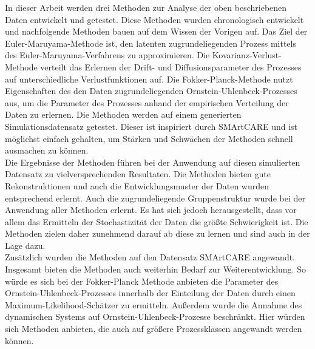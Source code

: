 \documentclass[11pt,titlepage]{article}
\theoremstyle{definition}
\theoremstyle{remark}
\begin{document}
	In dieser Arbeit werden drei Methoden zur Analyse der oben beschriebenen Daten entwickelt und getestet. Diese Methoden wurden chronologisch entwickelt und nachfolgende Methoden bauen auf dem Wissen der Vorigen auf. Das Ziel der Euler-Maruyama-Methode ist, den latenten zugrundeliegenden Prozess mittels des Euler-Maruyama-Verfahrens zu approximieren. Die Kovarianz-Verlust-Methode verteilt das Erlernen der Drift- und Diffusionsparameter des Prozesses auf unterschiedliche Verlustfunktionen auf. Die Fokker-Planck-Methode nutzt Eigenschaften des den Daten zugrundeliegenden Ornstein-Uhlenbeck-Prozesses aus, um die Parameter des Prozesses anhand der empirischen Verteilung der Daten zu erlernen. Die Methoden werden auf einem generierten Simulationsdatensatz getestet. Dieser ist inspiriert durch  SMArtCARE und ist möglichst einfach gehalten, um Stärken und Schwächen der Methoden schnell ausmachen zu können.\\
	Die Ergebnisse der Methoden führen bei der Anwendung auf diesen simulierten Datensatz zu vielversprechenden Resultaten. Die Methoden bieten gute Rekonstruktionen und auch die Entwicklungsmuster der Daten wurden entsprechend erlernt. Auch die zugrundeliegende Gruppenstruktur wurde bei der Anwendung aller Methoden erlernt. Es hat sich jedoch herausgestellt, dass vor allem das Ermitteln der Stochastizität der Daten die größte Schwierigkeit ist. Die Methoden zielen daher zunehmend darauf ab diese zu lernen und sind auch in der Lage dazu.\\
	Zusätzlich wurden die Methoden auf den Datensatz SMArtCARE angewandt.\\
	Insgesamt bieten die Methoden auch weiterhin Bedarf zur Weiterentwicklung. So würde es sich bei der Fokker-Planck Methode anbieten die Parameter des Ornstein-Uhlenbeck-Prozesses innerhalb der Einteilung der Daten durch einen Maximum-Likelihood-Schätzer zu ermitteln. Außerdem wurde die Annahme des dynamischen Systems auf Ornstein-Uhlenbeck-Prozesse beschränkt. Hier würden sich Methoden anbieten, die auch auf größere Prozessklassen angewandt werden können.
	
\end{document}
